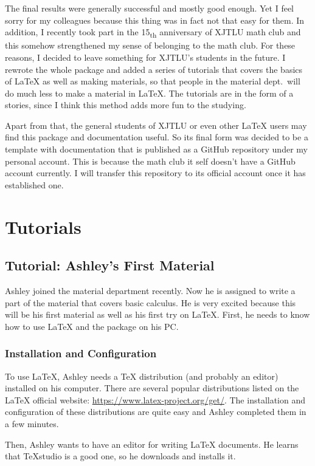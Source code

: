 \documentclass[oneside]{book}
\begin{document}
The final results were generally successful and mostly good enough. Yet I feel sorry for my colleagues because this thing was in fact not that easy for them. In addition, I recently took part in the 15\textsubscript{th} anniversary of XJTLU math club and this somehow strengthened my sense of belonging to the math club. For these reasons, I decided to leave something for XJTLU's students in the future. I rewrote the whole package and added a series of tutorials that covers the basics of \LaTeX{} as well as making materials, so that people in the material dept.~will do much less to make a material in \LaTeX. The tutorials are in the form of a stories, since I think this method adds more fun to the studying.

Apart from that, the general students of XJTLU or even other \LaTeX{} users may find this package and documentation useful. So its final form was decided to be a template with documentation that is published as a GitHub repository under my personal account. This is because the math club it self doesn't have a GitHub account currently. I will transfer this repository to its official account once it has established one.

\chapter{Tutorials}
\section{Tutorial: Ashley's First Material}
Ashley joined the material department recently. Now he is assigned to write a part of the material that covers basic calculus. He is very excited because this will be his first material as well as his first try on \LaTeX. First, he needs to know how to use \LaTeX{} and the package on his PC.

\subsection{Installation and Configuration}
To use \LaTeX{}, Ashley needs a \TeX{} distribution (and probably an editor) installed on his computer. There are several popular distributions listed on the \LaTeX{} official website: \url{https://www.latex-project.org/get/}. The installation and configuration of these distributions are quite easy and Ashley completed them in a few minutes.

Then, Ashley wants to have an editor for writing \LaTeX{} documents. He learns that \TeX studio is a good one, so he downloads and installs it.
\end{document}
